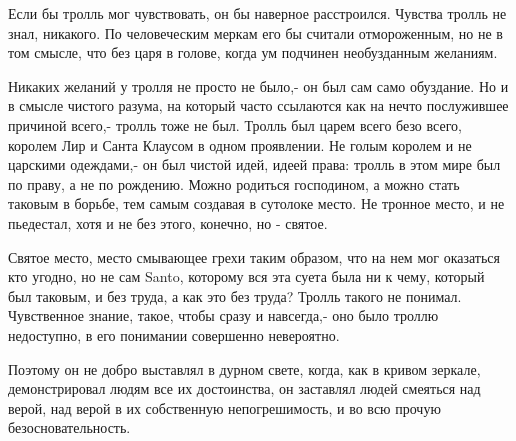Если бы тролль мог чувствовать, он бы наверное расстроился. Чувства тролль не
знал, никакого. По человеческим меркам его бы считали  отмороженным, но не в
том смысле, что без царя в голове, когда ум подчинен необузданным желаниям. 

Никаких желаний у тролля не просто не было,- он был сам само обуздание. Но и в
смысле чистого разума, на который часто ссылаются как на нечто послужившее
причиной всего,- тролль тоже не был.  Тролль был царем всего безо всего,
королем Лир и Санта Клаусом в одном проявлении. Не голым королем и не царскими
одеждами,- он был чистой идей, идеей права: тролль в этом мире был по праву, а
не по рождению. Можно родиться господином, а можно стать таковым в борьбе, тем
самым создавая в сутолоке место. Не тронное место, и не пьедестал, хотя и не
без этого, конечно, но - святое. 

Святое место, место смывающее грехи таким образом, что на нем мог оказаться кто
угодно, но не сам Santo, которому вся эта суета была ни к чему, который был
таковым, и без труда, а как это без труда?  Тролль такого не понимал.
Чувственное знание, такое, чтобы сразу и навсегда,- оно было троллю недоступно,
в его понимании совершенно невероятно. 

Поэтому он не добро выставлял в дурном свете, когда, как в кривом зеркале,
демонстрировал людям все их достоинства, он заставлял людей смеяться над верой,
над верой в их собственную непогрешимость, и во всю прочую безосновательность.
